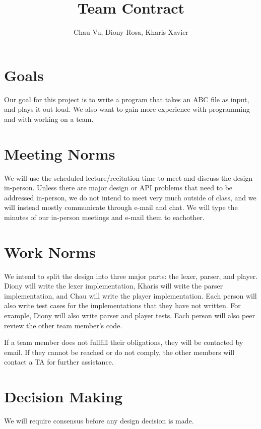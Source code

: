 \documentclass{article}
\title{Team Contract}
\author{Chau Vu, Diony Rosa, Kharis Xavier}
\begin{document}
\maketitle

\section{Goals}
Our goal for this project is to write a program that takes an ABC file as input,
and plays it out loud. We also want to gain more experience with programming and with working on a team.

\section{Meeting Norms}
We will use the scheduled lecture/recitation time to meet and discuss the design in-person.
Unless there are major design or API problems that need to be addressed in-person,
we do not intend to meet very much outside of class,
and we will instead mostly communicate through e-mail and chat.
We will type the minutes of our in-person meetings and e-mail them to eachother.

\section{Work Norms}
We intend to split the design into three major parts:
the lexer, parser, and player.
Diony will write the lexer implementation,
Kharis will write the parser implementation,
and Chau will write the player implementation.
Each person will also write test cases for the implementations that they have not written. For example, Diony will also write parser and player tests.
Each person will also peer review the other team member's code.


If a team member does not fullfill their obligations, they will be contacted by email.
If they cannot be reached or do not comply, the other members will contact a TA for further assistance.

\section{Decision Making}
We will require consensus before any design decision is made.
\end{document}
